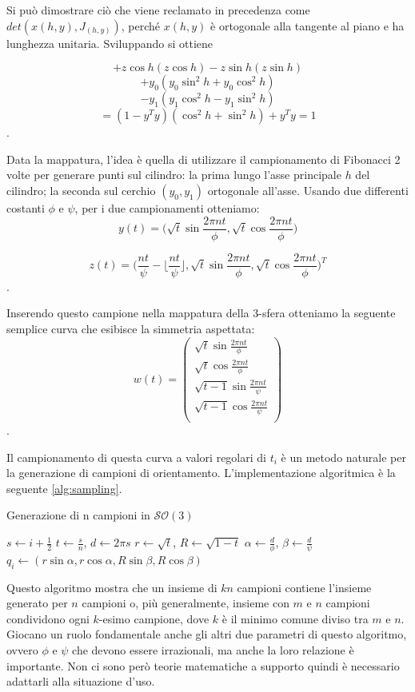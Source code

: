 Si può dimostrare ciò che viene reclamato in precedenza come $det(x(h, y), J_(h, y))$, perché $x(h, y)$ è ortogonale alla tangente al piano e ha lunghezza unitaria. Sviluppando si ottiene

$$
	+z \cos{h}(z \cos{h}) - z \sin{h}(z \sin{h})
$$
$$
	+y_0 (y_0 \sin^2{h} + y_0 \cos^2{h}) 
$$
$$
	-y_1 (y_1 \cos^2{h} - y_1 \sin^2{h}) 
$$
$$
	= (1 - y^Ty)(\cos^2{h} + \sin^2{h}) + y^Ty = 1
$$.

Data la mappatura, l'idea è quella di utilizzare il campionamento di Fibonacci 2 volte per generare punti sul cilindro: la prima lungo l'asse principale $h$ del cilindro; la seconda sul cerchio $(y_0, y_1)$ ortogonale all'asse. Usando due differenti costanti $\phi$ e $\psi$, per i due campionamenti otteniamo:
$$
	y(t) = \bigg(\sqrt{t}\sin{\frac{2\pi nt}{\phi}}, \sqrt{t}\cos{\frac{2\pi nt}{\phi}} \bigg)
$$

$$
	z(t) = \bigg(\frac{nt}{\psi} - \biggl\lfloor\frac{nt}{\psi}\biggl\rfloor, \sqrt{t}\sin{\frac{2\pi nt}{\phi}}, \sqrt{t}\cos{\frac{2\pi nt}{\phi}}\bigg)^T
$$.

Inserendo questo campione nella mappatura della 3-sfera otteniamo la seguente semplice curva che esibisce la simmetria aspettata:
$$
w(t) = \begin{pmatrix}
	\sqrt{t}\sin{\frac{2\pi nt}{\phi}} \\
	\sqrt{t}\cos{\frac{2\pi nt}{\phi}} \\
	\sqrt{t-1}\sin{\frac{2\pi nt}{\psi}} \\
	\sqrt{t-1}\cos{\frac{2\pi nt}{\psi}} \\
\end{pmatrix}
$$.

Il campionamento di questa curva a valori regolari di $t_i$ è un metodo naturale per la generazione di campioni di orientamento. L'implementazione algoritmica è la seguente \ref{alg:sampling}.
\begin{algorithm}
	\caption{Generazione di n campioni in $\mathcal{SO}(3)$}\label{alg:sampling}
	\begin{algorithmic}
				 \State $s \gets i + \frac{1}{2}$
				 \State $t \gets \frac{s}{n}$, $d \gets 2\pi s$
				 \State $r \gets \sqrt{t}$, $R \gets \sqrt{1 - t}$
				 \State $\alpha \gets \frac{d}{\phi}$, $\beta \gets \frac{d}{\psi}$
				 \State $q_i \gets (r\sin{\alpha}, r\cos{\alpha}, R\sin{\beta}, R\cos{\beta})$
		    \EndFor
	    \EndFunction
	\end{algorithmic}
\end{algorithm}

Questo algoritmo mostra che un insieme di $kn$ campioni contiene l'insieme generato per $n$ campioni o, più generalmente, insieme con $m$ e $n$ campioni condividono ogni $k$-esimo campione, dove $k$ è il minimo comune diviso tra $m$ e $n$. Giocano un ruolo fondamentale anche gli altri due parametri di questo algoritmo, ovvero $\phi$ e $\psi$ che devono essere irrazionali, ma anche la loro relazione è importante. Non ci sono però teorie matematiche a supporto quindi è necessario adattarli alla situazione d'uso.
